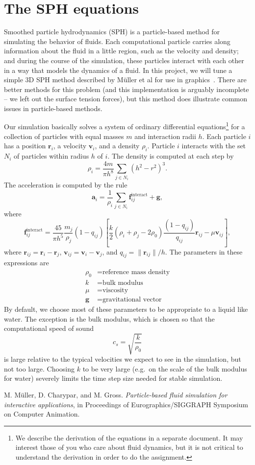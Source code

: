 \documentclass[10pt, leqno]{article} %
\newcommand{\bfr}{\mathbf{r}}
\newcommand{\bfv}{\mathbf{v}}
\newcommand{\bfa}{\mathbf{a}}
\newcommand{\bff}{\mathbf{f}}
\newcommand{\bfg}{\mathbf{g}}
\begin{document}
\pagestyle{fancy}
\fancyfoot{}

\section{The SPH equations}

Smoothed particle hydrodynamics (SPH) is a particle-based method for
simulating the behavior of fluids.  Each computational particle
carries along information about the fluid in a little region, such as
the velocity and density; and during the course of the simulation,
these particles interact with each other in a way that models the
dynamics of a fluid.  In this project, we will tune a simple 3D 
SPH method described by M\"uller et al for use in
graphics~\cite{muller}.  There are better methods for this problem
(and this implementation is arguably incomplete -- we left out the
surface tension forces), but this method does illustrate common issues
in particle-based methods.

Our simulation basically solves a system of ordinary differential
equations\footnote{%
  We describe the derivation of the equations in a separate document.
  It may interest those of you who care about fluid dynamics, but it is
  not critical to understand the derivation in order to do the assignment.
}
for a collection of particles with equal masses $m$ and
interaction radii $h$.  Each particle $i$ has a position $\bfr_i$,
a velocity $\bfv_i$, and a density $\rho_i$.  Particle $i$ interacts
with the set $N_i$ of particles within radius $h$ of $i$.
The density is computed at each step by
\[
  \rho_i = \frac{4m}{\pi h^8} \sum_{j \in N_i} (h^2 - r^2)^3.
\]
The acceleration is computed by the rule
\[
  \bfa_i = \frac{1}{\rho_i} \sum_{j \in N_i} \bff_{ij}^{\mathrm{interact}} + \bfg,
\]
where
\[
  \bff_{ij}^{\mathrm{interact}} =
  \frac{45}{\pi h^5} \frac{m_j}{\rho_j} (1-q_{ij}) \left[
    \frac{k}{2} (\rho_i + \rho_j - 2 \rho_0) \frac{(1-q_{ij})}{q_{ij}} \bfr_{ij} -
    \mu \bfv_{ij}
  \right],
\]
where $\bfr_{ij} = \bfr_i-\bfr_j$, $\bfv_{ij} = \bfv_i-\bfv_j$,
and $q_{ij} = \|\bfr_{ij}\|/h$.  The parameters in these expressions are
\begin{align*}
  \rho_0 &= \mbox{reference mass density} \\
  k      &= \mbox{bulk modulus} \\
  \mu    &= \mbox{viscosity} \\
  \bfg   &= \mbox{gravitational vector}
\end{align*}
By default, we choose most of these parameters to be appropriate to a liquid
like water.  The exception is the bulk modulus, which is chosen so that the
computational speed of sound
\[
  c_s = \sqrt{\frac{k}{\rho_0}}
\]
is large relative to the typical velocities we expect to see in the
simulation, but not too large.  Choosing $k$ to be very large (e.g.~on
the scale of the bulk modulus for water) severely limits the time step
size needed for stable simulation.



\begin{thebibliography}{10}

{\sc M. M\"uller, D. Charypar, and M. Gross}.
{\em Particle-based fluid simulation for interactive applications},
in Proceedings of Eurographics/SIGGRAPH Symposium on Computer Animation.

\end{thebibliography}
\end{document}
